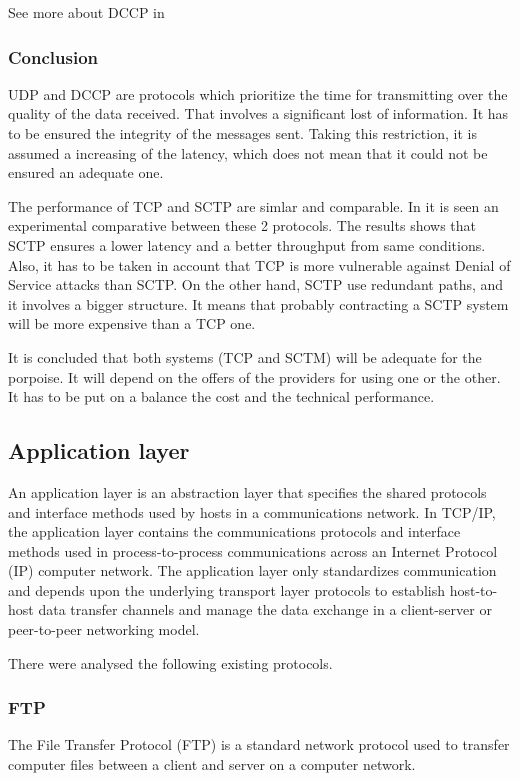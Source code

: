 See more about DCCP in \cite{DCCP}

\subsubsection{Conclusion}
UDP and DCCP are protocols which prioritize the time for transmitting over the quality of the data received. That involves a significant lost of information. It has to be ensured the integrity of the messages sent. Taking this restriction, it is assumed a increasing of the latency, which does not mean that it could not be ensured an adequate one.

The performance of TCP and SCTP are simlar and comparable. In \cite{SCTP_TCP} it is seen an experimental comparative between these 2 protocols. The results shows that SCTP ensures a lower latency and a better throughput from same conditions. Also, it has to be taken in account that TCP is more vulnerable against Denial of Service attacks than SCTP. On the other hand, SCTP use redundant paths, and it involves a bigger structure. It means that probably contracting a SCTP system will be more expensive than a TCP one. 

It is concluded that both systems (TCP and SCTM) will be adequate for the porpoise. It will depend on the offers of the providers for using one or the other. It has to be put on a balance the cost and the technical performance.

\subsection{Application layer}
An application layer is an abstraction layer that specifies the shared protocols and interface methods used by hosts in a communications network. In TCP/IP, the application layer contains the communications protocols and interface methods used in process-to-process communications across an Internet Protocol (IP) computer network. The application layer only standardizes communication and depends upon the underlying transport layer protocols to establish host-to-host data transfer channels and manage the data exchange in a client-server or peer-to-peer networking model. 

There were analysed the following existing protocols.

\subsubsection{FTP}
The File Transfer Protocol (FTP) is a standard network protocol used to transfer computer files between a client and server on a computer network.

